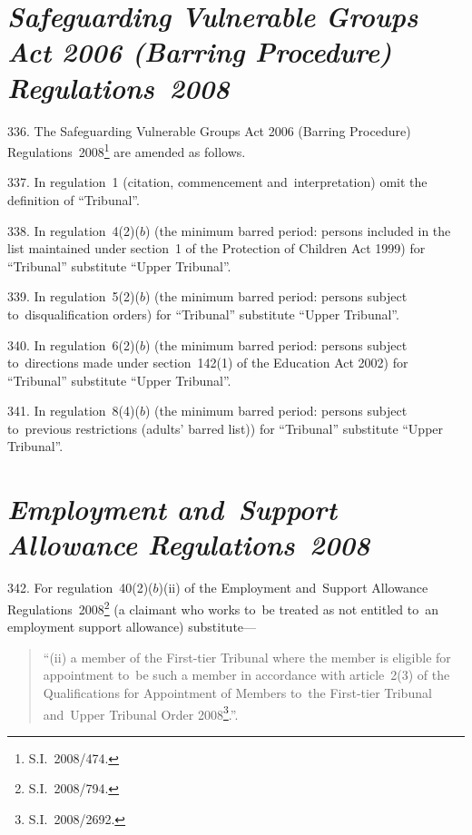 \documentclass[12pt,a4paper]{article}
\begin{document}
\section*{\itshape\sloppy Safeguarding Vulnerable Groups Act 2006 (Barring Procedure) Regulations~2008}

336.  The Safeguarding Vulnerable Groups Act 2006 (Barring Procedure) Regulations~2008\footnote{S.I.~2008/474.} are amended as follows.

\medskip

337.  In regulation~1 (citation, commencement and~interpretation) omit the definition of “Tribunal”.

\medskip

338.  In regulation~4(2)($b$)  (the minimum barred period: persons included in the list maintained under section~1 of the Protection of Children Act 1999) for “Tribunal” substitute “Upper Tribunal”.

\medskip

339.  In regulation~5(2)($b$)  (the minimum barred period: persons subject to~disqualification orders) for “Tribunal” substitute “Upper Tribunal”.

\medskip

340.  In regulation~6(2)($b$)  (the minimum barred period: persons subject to~directions made under section~142(1) of the Education Act 2002) for “Tribunal” substitute “Upper Tribunal”.

\medskip

341.  In regulation~8(4)($b$)  (the minimum barred period: persons subject to~previous restrictions (adults’ barred list)) for “Tribunal” substitute “Upper Tribunal”.

\section*{\itshape Employment and~Support Allowance Regulations~2008}

342.  For regulation~40(2)($b$)(ii)  of the Employment and~Support Allowance Regulations~2008\footnote{S.I.~2008/794.} (a claimant who works to~be treated as not entitled to~an employment support allowance) substitute—
\begin{quotation}
“(ii) a member of the First-tier Tribunal where the member is eligible for appointment to~be such a member in accordance with article~2(3) of the Qualifications for Appointment of Members to~the First-tier Tribunal and~Upper Tribunal Order 2008\footnote{S.I.~2008/2692.}.”.
\end{quotation}
\end{document}
